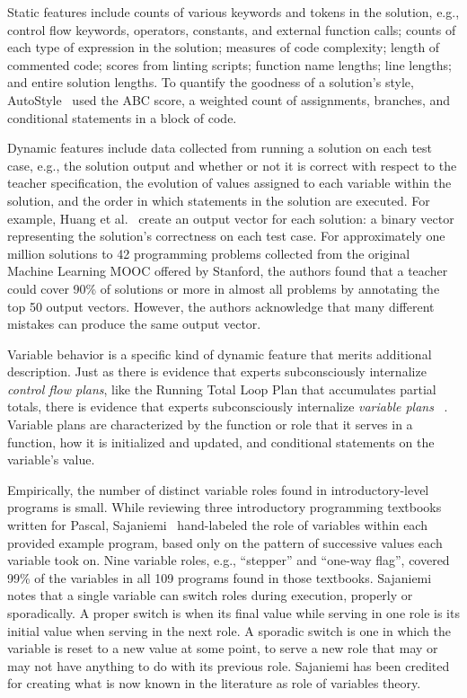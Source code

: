 Static features include counts of various keywords and tokens in the solution, e.g., control flow keywords, operators, constants, and external function calls; counts of each type of expression in the solution;  measures of code complexity; length of commented code; scores from linting scripts; function name lengths; line lengths; and entire solution lengths. To quantify the goodness of a solution's style, AutoStyle~\cite{choudhury2016autostyle} used the ABC score, a weighted count of assignments, branches, and conditional statements in a block of code.

Dynamic features include data collected from running a solution on each test case, e.g., the solution output and whether or not it is correct with respect to the teacher specification, the evolution of values assigned to each variable within the solution, and the order in which statements in the solution are executed. For example, Huang et al.~\cite{MOOCshop} create an output vector for each solution: a binary vector representing the solution's correctness on each test case. For approximately one million solutions to 42 programming problems collected from the original Machine Learning MOOC offered by Stanford, the authors found that a teacher could cover 90\% of solutions or more in almost all problems by annotating the top 50 output vectors. However, the authors acknowledge that many different mistakes can produce the same output vector.


Variable behavior is a specific kind of dynamic feature that merits additional description. Just as there is evidence that experts subconsciously internalize {\it control flow plans}, like the Running Total Loop Plan that accumulates partial totals, there is evidence that experts subconsciously internalize {\it variable plans} ~\cite{variableplans}. Variable plans are characterized by the function or role that it serves in a function, how it is initialized and updated, and conditional statements on the variable's value. 

Empirically, the number of distinct variable roles found in introductory-level programs is small. While reviewing three introductory programming textbooks written for Pascal, Sajaniemi~\cite{sajaniemi2002empirical} hand-labeled the role of variables within each provided example program, based only on the pattern of successive values each variable took on. Nine variable roles, e.g., ``stepper'' and ``one-way flag'', covered 99\% of the variables in all 109 programs found in those textbooks. Sajaniemi notes that a single variable can switch roles during execution, properly or sporadically. A proper switch is when its final value while serving in one role is its initial value when serving in the next role. A sporadic switch is one in which the variable is reset to a new value at some point, to serve a new role that may or may not have anything to do with its previous role. Sajaniemi has been credited for creating what is now known in the literature as role of variables theory. 

